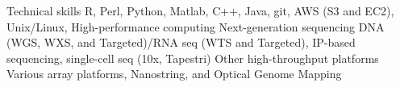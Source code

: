 


\begin{cvskills}


\cvskill
{Technical skills} %
{R, Perl, Python, Matlab, C++, Java, git, AWS (S3 and EC2), Unix/Linux, High-performance computing} %
\cvskill
{Next-generation sequencing} %
{DNA (WGS, WXS, and Targeted)/RNA seq (WTS and Targeted), IP-based sequencing, single-cell seq (10x, Tapestri)} %
\cvskill
{Other high-throughput platforms} %
{Various array platforms, Nanostring, and Optical Genome Mapping} %
\end{cvskills}
